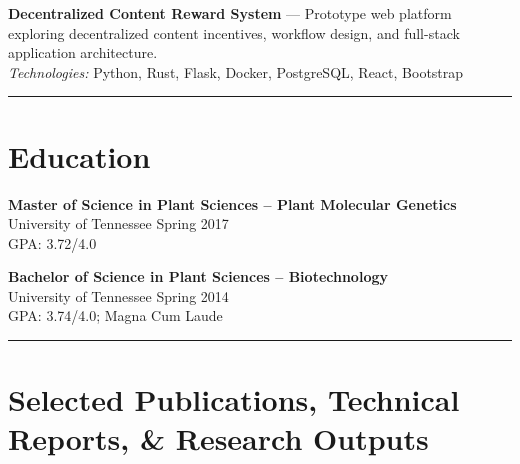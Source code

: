 \documentclass[10pt]{article}
\newcommand{\sectionline}{\vspace{0.25em}\noindent\rule{\textwidth}{0.4pt}\vspace{-0.45em}}
\newcommand{\cvsection}[2]{\sectionline\section*{{\mdseries #1}\hspace{0.35em}#2}\vspace{-0.45em}}
\newcommand{\project}[3]{%
    \textbf{#1} --- #2\\
    \textit{Technologies:} #3
}
\begin{document}
\project{Decentralized Content Reward System}{Prototype web platform exploring decentralized content incentives, workflow design, and full-stack application architecture.}{Python, Rust, Flask, Docker, PostgreSQL, React, Bootstrap}

\cvsection{\faUniversity}{Education}
\textbf{Master of Science in Plant Sciences -- Plant Molecular Genetics}\\
University of Tennessee \hfill Spring 2017\\
GPA: 3.72/4.0

\textbf{Bachelor of Science in Plant Sciences -- Biotechnology}\\
University of Tennessee \hfill Spring 2014\\
GPA: 3.74/4.0; Magna Cum Laude

\cvsection{\faBook}{Selected Publications, Technical Reports, \& Research Outputs}
\nocite{*}
\printbibliography[heading=none]
\end{document}
